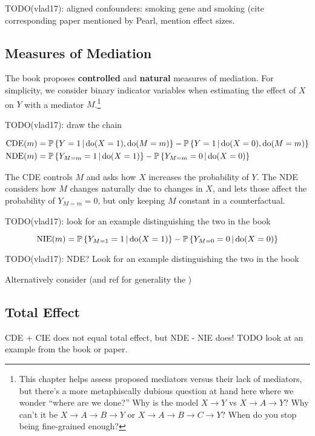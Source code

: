 \documentclass{article}
\begin{document}
TODO(vlad17): aligned confounders: smoking gene and smoking (cite corresponding paper mentioned by Pearl, mention effect sizes.

\subsection{Measures of Mediation}

The book proposes \textbf{controlled} and \textbf{natural} measures of mediation. For simplicity, we consider binary indicator variables when estimating the effect of $X$ on $Y$ with a mediator $M$.\footnote{This chapter helps assess proposed mediators versus their lack of mediators, but there's a more metaphiscally dubious question at hand here where we wonder ``where are we done?'' Why is the model $X\rightarrow Y$ vs $X\rightarrow A \rightarrow Y$? Why can't it be $X\rightarrow A \rightarrow B\rightarrow Y$ or $X\rightarrow A \rightarrow B\rightarrow C\rightarrow Y$? When do you stop being fine-grained enough?}

TODO(vlad17): draw the chain

\begin{align*}
  \mathrm{CDE}(m)&=\operatorname{\mathbb{P}}\left\{ Y=1 \,\middle|\, \mathrm{do}(X=1), \mathrm{do}(M=m) \right\} -\operatorname{\mathbb{P}}\left\{ Y=1 \,\middle|\, \mathrm{do}(X=0), \mathrm{do}(M=m) \right\}\\
  \mathrm{NDE}(m)&=\operatorname{\mathbb{P}}\left\{ Y_{M=m}=1 \,\middle|\, \mathrm{do}(X=1) \right\} -\operatorname{\mathbb{P}}\left\{ Y_{M=m}=0 \,\middle|\, \mathrm{do}(X=0) \right\}
\end{align*}

The CDE controls $M$ and asks how $X$ increases the probability of $Y$. The NDE considers how $M$ changes naturally due to changes in $X$, and lets those affect the probability of $Y_{M=m}=0$, but only keeping $M$ constant in a counterfactual.

TODO(vlad17): look for an example distinguishing the two in the book

$$
  \mathrm{NIE}(m)=\operatorname{\mathbb{P}}\left\{ Y_{M=1}=1 \,\middle|\, \mathrm{do}(X=1) \right\} -\operatorname{\mathbb{P}}\left\{ Y_{M=0}=0 \,\middle|\, \mathrm{do}(X=0) \right\}
$$

TODO(vlad17): NDE? Look for an example distinguishing the two in the book

Alternatively consider (and ref for generality the )

\subsection{Total Effect}

CDE + CIE does not equal total effect, but NDE - NIE does! TODO look at an example from the book or paper.
\end{document}
